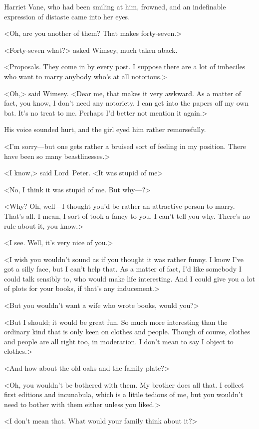 Harriet Vane, who had been smiling at him, frowned, and an indefinable expression of distaste came into her eyes.

<Oh, are you another of them? That makes forty-seven.>

<Forty-seven what?> asked Wimsey, much taken aback.

<Proposals. They come in by every post. I suppose there are a lot of imbeciles who want to marry anybody who's at all notorious.>

<Oh,> said Wimsey. <Dear me, that makes it very awkward. As a matter of fact, you know, I don't need any notoriety. I can get into the papers off my own bat. It's no treat to me. Perhaps I'd better not mention it again.>

His voice sounded hurt, and the girl eyed him rather remorsefully.

<I'm sorry—but one gets rather a bruised sort of feeling in my position. There have been so many beastlinesses.>

<I know,> said Lord~Peter. <It was stupid of me\longdash>

<No, I think it was stupid of me. But why—?>

<Why? Oh, well—I thought you'd be rather an attractive person to marry. That's all. I mean, I sort of took a fancy to you. I can't tell you why. There's no rule about it, you know.>

<I see. Well, it's very nice of you.>

<I wish you wouldn't sound as if you thought it was rather funny. I know I've got a silly face, but I can't help that. As a matter of fact, I'd like somebody I could talk sensibly to, who would make life interesting. And I could give you a lot of plots for your books, if that's any inducement.>

<But you wouldn't want a wife who wrote books, would you?>

<But I should; it would be great fun. So much more interesting than the ordinary kind that is only keen on clothes and people. Though of course, clothes and people are all right too, in moderation. I don't mean to say I object to clothes.>

<And how about the old oaks and the family plate?>

<Oh, you wouldn't be bothered with them. My brother does all that. I collect first editions and incunabula, which is a little tedious of me, but you wouldn't need to bother with them either unless you liked.>

<I don't mean that. What would your family think about it?>

